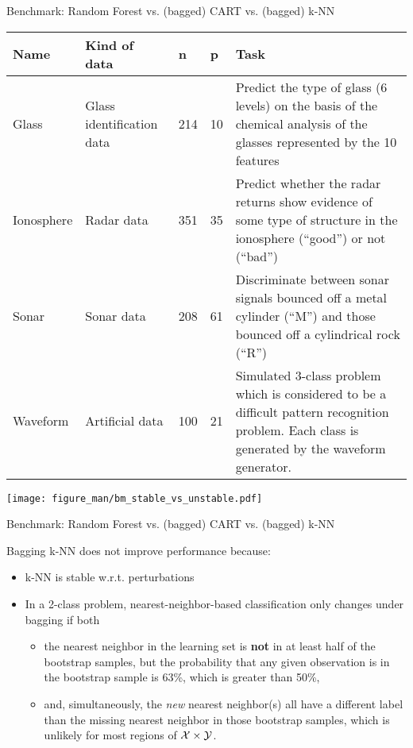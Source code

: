 \documentclass[11pt,compress,t,notes=noshow, xcolor=table]{beamer}
\begin{document}
\begin{vbframe}{Benchmark: Random Forest vs. (bagged) CART vs. (bagged) k-NN}
\begin{table}
\footnotesize
\begin{tabular}{p{1.5cm}p{2cm}p{0.5cm}p{0.5cm}p{5cm}}
Name & Kind of data &  n & p & Task\\
\hline
Glass & Glass identification data & 214 & 10 & Predict the type of glass (6 levels) on the basis of the chemical analysis of the glasses represented by the 10 features\\
Ionosphere & Radar data & 351 & 35 & Predict whether the radar returns show evidence of some type of structure in the ionosphere (\enquote{good}) or not (\enquote{bad}) \\
Sonar & Sonar data & 208 & 61 & Discriminate between sonar signals bounced off a metal cylinder (\enquote{M}) and those bounced off a cylindrical rock (\enquote{R})\\
Waveform & Artificial data & 100 & 21 & Simulated 3-class problem which is considered to be a difficult pattern recognition problem. Each class is generated by the waveform generator.\\
\hline
\end{tabular}
\end{table}

\framebreak

\begin{center}\texttt{[image: figure\_man/bm\_stable\_vs\_unstable.pdf]}\end{center}{}


\end{vbframe}

\begin{vbframe}{Benchmark: Random Forest vs. (bagged) CART vs. (bagged) k-NN}

  Bagging k-NN does not improve performance because:

  \begin{itemize}
    \item k-NN is stable w.r.t. perturbations
    \item In a 2-class problem, nearest-neighbor-based classification only changes under bagging if both
    \begin{itemize}
    \item the nearest neighbor in the learning set is \textbf{not} in at least half of the bootstrap samples, but the probability that any given observation is in the bootstrap sample is 63\%, which is greater than 50\%,
    \item and, simultaneously, the \emph{new} nearest neighbor(s) all have a different label than the missing nearest neighbor in those bootstrap samples, which is unlikely for most regions of $\mathcal{X} \times \mathcal{Y}$.
    \end{itemize}
\end{itemize}
\end{vbframe}


\endlecture
\end{document}
